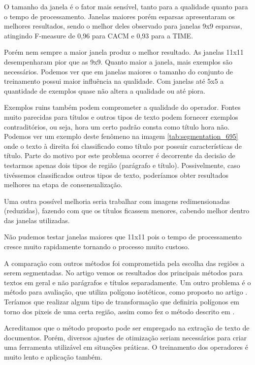 \documentclass[a4paper,11pt]{article}
\begin{document}
  O tamanho da janela é o fator mais sensível, tanto para a qualidade quanto para o tempo de processamento. Janelas maiores porém esparsas apresentaram os melhores resultados, sendo o melhor deles observado para janelas 9x9 esparsas, atingindo F-measure de 0,96 para CACM e 0,93 para a TIME.

  Porém nem sempre a maior janela produz o melhor resultado. As janelas 11x11 desempenharam pior que as 9x9. Quanto maior a janela, mais exemplos são necessários. Podemos ver que em janelas maiores o tamanho do conjunto de treinamento possui maior influência na qualidade. Com janelas até 5x5 a quantidade de exemplos quase não altera a qualidade ou até piora.

  Exemplos ruins também podem comprometer a qualidade do operador. Fontes muito parecidas para títulos e outros tipos de texto podem fornecer exemplos contraditórios, ou seja, hora um certo padrão consta como título hora não. Podemos ver um exemplo deste fenômeno na imagem \ref{tab:segmentation_695} onde o texto à direita foi classificado como título por possuir características de título. Parte do motivo por este problema ocorrer é decorrente da decisão de testarmos apenas dois tipos de região (parágrafo e título). Possivelmente, caso tivéssemos classificados outros tipos de texto, poderíamos obter resultados melhores na etapa de consensualização.

  Uma outra possível melhoria seria trabalhar com imagens redimensionadas (reduzidas), fazendo com que os títulos ficassem menores, cabendo melhor dentro das janelas utilizadas.

  Não pudemos testar janelas maiores que 11x11 pois o tempo de processamento cresce muito rapidamente tornando o processo muito custoso.

  A comparação com outros métodos foi comprometida pela escolha das regiões a serem segmentadas. No artigo \cite{DBLP:conf/icdar/2009} vemos os resultados dos principais métodos para textos em geral e não parágrafos e títulos separadamente. Um outro problema é o método para avaliação, que utiliza polígono isotéticos, como proposto no artigo \cite{10.1109/ICDAR.2007.207}. Teríamos que realizar algum tipo de transformação que definiria polígonos em torno dos pixeis de uma certa região, assim como fez o método descrito em \cite{Moll07documentcontent}.

  Acreditamos que o método proposto pode ser empregado na extração de texto de documentos. Porém, diversos ajustes de otimização seriam necessários para criar uma ferramenta utilizável em situações práticas. O treinamento dos operadores é muito lento e aplicação também.
\end{document}
